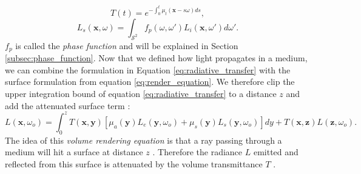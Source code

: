 \begin{equation}
    \label{eq:beer_lambert_law}
    T(t) = e^{-\int_0^t \mu_t(\boldsymbol{x} - s\omega)ds},
\end{equation}
\begin{equation}
    \label{eq:in_scattered_radiance}
    L_s(\boldsymbol{x}, \omega) = \int_{\mathcal{S}^2} f_p(\omega, \omega')L_i(\boldsymbol{x}, \omega')d\omega'.
\end{equation}
$f_p$ is called the \textit{phase function} and will be explained in Section \ref{subsec:phase_function}.
Now that we defined how light propagates in a medium, we can combine the formulation in Equation \ref{eq:radiative_transfer} with the surface formulation from equation \ref{eq:render_equation}.
We therefore clip the upper integration bound of equation \ref{eq:radiative_transfer} to a distance $z$ and add the attenuated surface term \cite{novak_overview}:
\begin{equation*}
    L(\boldsymbol{x}, \omega_o) = \int_0^z T(\boldsymbol{x}, \boldsymbol{y})[\mu_a(\boldsymbol{y})L_e(\boldsymbol{y}, \omega_o) + \mu_s(\boldsymbol{y})L_s(\boldsymbol{y}, \omega_o)]dy + T(\boldsymbol{x}, \boldsymbol{z})L(\boldsymbol{z}, \omega_o).
\end{equation*}
The idea of this \textit{volume rendering equation} is that a ray passing through a medium will hit a surface at distance $z$ \cite{novak_overview}.
Therefore the radiance $L$ emitted and reflected from this surface is attenuated by the volume transmittance $T$ \cite{pbr}.

